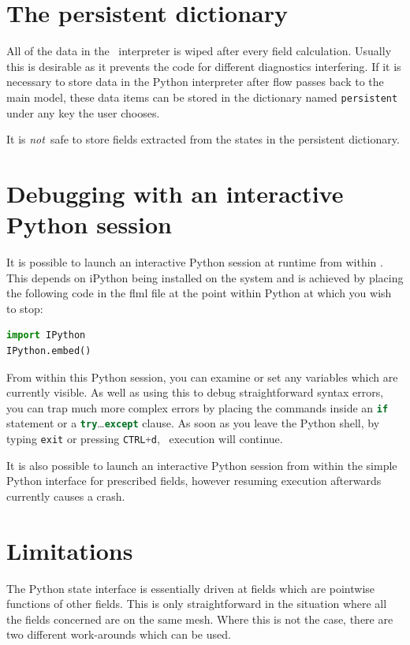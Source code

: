 \section{The persistent dictionary}

All of the data in the \fluidity\ interpreter is wiped after every field
calculation. Usually this is desirable as it prevents the code for different
diagnostics interfering. If it is necessary to store data in the Python
interpreter after flow passes back to the main model, these data items can
be stored in the dictionary named \lstinline[language=Python]+persistent+
under any key the user chooses.

It is \emph{not}\ safe to store fields extracted from the states in the
persistent dictionary.

\section{Debugging with an interactive Python session}

It is possible to launch an interactive Python session at runtime from
within \fluidity. This depends on iPython being installed on the system and
is achieved by placing the following code in the flml file at the point
within Python at which you wish to stop:
\begin{lstlisting}[language=Python]
import IPython
IPython.embed()
\end{lstlisting}
From within this Python
session, you can examine or set any variables which are currently
visible. As well as using this to debug straightforward syntax errors, you
can trap much more complex errors by placing the commands inside an
\lstinline[language=Python]+if+ statement or a
\lstinline[language=Python]+try+\ldots\lstinline[language=Python]+except+ clause.
As soon as you leave the Python shell, by typing \lstinline[language=Python]+exit+ or pressing \lstinline[language=Python].CTRL+d., \fluidity\ execution will continue.

It is also possible to launch an interactive Python session from within the
simple Python interface for prescribed fields, however resuming execution
afterwards currently causes a crash.

\section{Limitations}

The Python state interface is essentially driven at fields which are
pointwise functions of other fields. This is only straightforward in the
situation where all the fields concerned are on the same mesh. Where this is
not the case, there are two different work-arounds which can be used.

